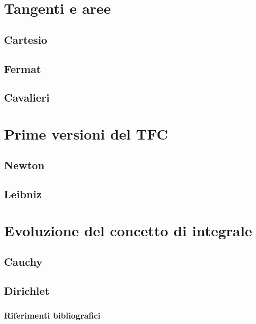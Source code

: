 \documentclass[8pt]{beamer}
\begin{document}
\section{Tangenti e aree}
\subsection{Cartesio}

\subsection{Fermat}


\subsection{Cavalieri}


\section{Prime versioni del TFC}
\subsection{Newton}

\subsection{Leibniz}


\section{Evoluzione del concetto di integrale}
\subsection{Cauchy}

\subsection{Dirichlet}


\begin{frame} %

  \frametitle{Riferimenti bibliografici}
  
  \scriptsize{}
  
  
\end{frame}
\end{document}
